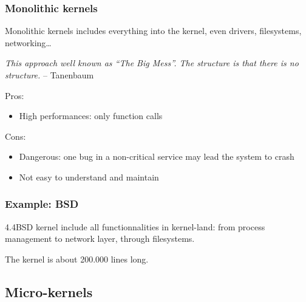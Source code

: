 \begin{frame}
  \frametitle{Monolithic kernels}

  Monolithic kernels includes everything into the kernel, even
  drivers, filesystems, networking\ldots

  \-

  \emph{This approach well known as ``The Big Mess''. The structure is
  that there is no structure.} -- Tanenbaum

  \-

  Pros:

  \begin{itemize}
  \item
    High performances: only function calls
  \end{itemize}

  \-

  Cons:

  \begin{itemize}
  \item
    Dangerous: one bug in a non-critical service may lead the system
    to crash
  \item
    Not easy to understand and maintain
  \end{itemize}

\end{frame}

%
%

\begin{frame}
  \frametitle{Example: BSD}

  4.4BSD kernel include all functionnalities in kernel-land: from
    process management to network layer, through filesystems.

  \begin{center}
  \end{center}

  The kernel is about 200.000 lines long.

\end{frame}

%
%

\subsection{Micro-kernels}

%
%


